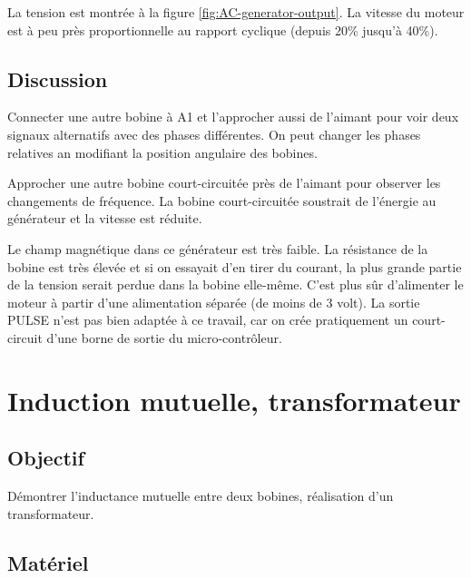 \documentclass{book}
\begin{document}
La tension est montrée à la figure  \ref{fig:AC-generator-output}. La vitesse du moteur est à peu près proportionnelle au rapport cyclique (depuis 20\%{} jusqu'à 40\%{}).

\subsection{Discussion}


Connecter une autre bobine à A1 et l'approcher aussi de l'aimant pour voir deux signaux alternatifs avec des phases différentes. On peut changer les phases relatives an modifiant la position angulaire des bobines.



Approcher une autre bobine court-circuitée près de l'aimant pour observer les changements de fréquence. La bobine court-circuitée soustrait de l'énergie au générateur et la vitesse est réduite.



Le champ magnétique dans ce générateur est très faible. La résistance de la bobine est très élevée et si on essayait d'en tirer du courant, la plus grande partie de la tension serait perdue dans la bobine elle-même. C'est plus sûr d'alimenter le moteur à partir d'une alimentation séparée (de moins de 3 volt). La sortie PULSE n'est pas bien adaptée à ce travail, car on crée pratiquement un court-circuit d'une borne de sortie du micro-contrôleur.







\section{Induction mutuelle, transformateur}



\subsection{Objectif}


Démontrer l'inductance mutuelle entre deux bobines, réalisation d'un transformateur.




\subsection{Matériel}
\end{document}

